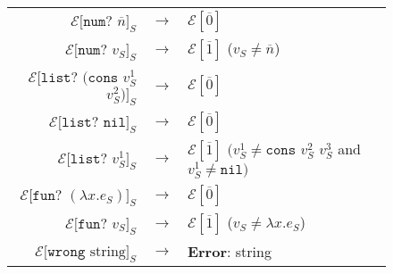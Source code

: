\begin{figure}[p]
\begin{center}
\begin{tabular}{rcl}
$\mathscr{E}[\mathtt{num?}$ $\overline{n}]_{S}$ & $\rightarrow$ & $\mathscr{E}[\overline{0}]$ \\
$\mathscr{E}[\mathtt{num?}$ $v_{S}]_{S}$ & $\rightarrow$ & $\mathscr{E}[\overline{1}]$ ($v_{S}\neq\overline{n}$) \\
$\mathscr{E}[\mathtt{list?}$ $(\mathtt{cons}$ $v_{S}^{1}$ $v_{S}^{2})]_{S}$ & $\rightarrow$ & $\mathscr{E}[\overline{0}]$ \\
$\mathscr{E}[\mathtt{list?}$ $\mathtt{nil}]_{S}$ & $\rightarrow$ & $\mathscr{E}[\overline{0}]$ \\
$\mathscr{E}[\mathtt{list?}$ $v_{S}^{1}]_{S}$ & $\rightarrow$ & $\mathscr{E}[\overline{1}]$ $(v_{S}^{1}\neq\mathtt{cons}$ $v_{S}^{2}$ $v_{S}^{3}$ and $v_{S}^{1}\neq\mathtt{nil})$ \\
$\mathscr{E}[\mathtt{fun?}$ $(\lambda x.e_{S})]_{S}$ & $\rightarrow$ & $\mathscr{E}[\overline{0}]$ \\
$\mathscr{E}[\mathtt{fun?}$ $v_{S}]_{S}$ & $\rightarrow$ & $\mathscr{E}[\overline{1}]$ ($v_{S}\neq\lambda x.e_{S}$) \\
$\mathscr{E}[\mathtt{wrong}$ $\mathrm{string}]_{S}$ & $\rightarrow$ & \textbf{Error}: string
\end{tabular}
\end{center}
\end{figure}